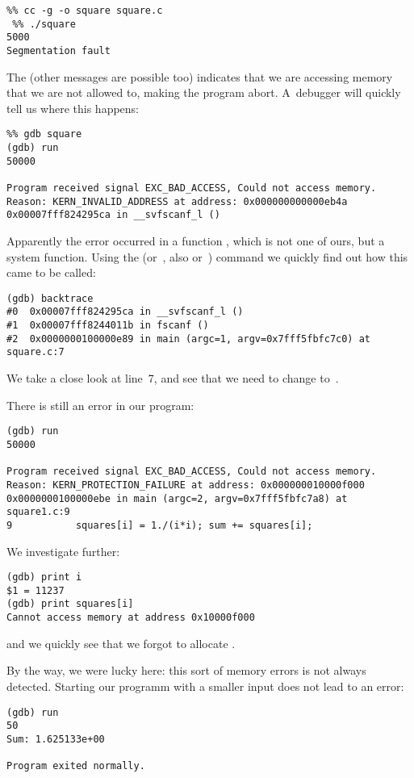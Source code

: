 \begin{verbatim}
%% cc -g -o square square.c
 %% ./square
5000
Segmentation fault
\end{verbatim}
The  (other messages are possible too) 
indicates that we are accessing
memory that we are not allowed to, making the program
abort. A~debugger will quickly tell us where this happens:
\begin{verbatim}
%% gdb square
(gdb) run
50000

Program received signal EXC_BAD_ACCESS, Could not access memory.
Reason: KERN_INVALID_ADDRESS at address: 0x000000000000eb4a
0x00007fff824295ca in __svfscanf_l ()
\end{verbatim}
Apparently the error occurred in a function , which is
not one of ours, but a system function. Using the 
(or~, also  or~) command we quickly find out how
this came to be called:
\begin{verbatim}
(gdb) backtrace
#0  0x00007fff824295ca in __svfscanf_l ()
#1  0x00007fff8244011b in fscanf ()
#2  0x0000000100000e89 in main (argc=1, argv=0x7fff5fbfc7c0) at square.c:7
\end{verbatim}
We take a close look at line~7, and see that we need to
change  to~.

There is still an error in our program:
\begin{verbatim}
(gdb) run
50000

Program received signal EXC_BAD_ACCESS, Could not access memory.
Reason: KERN_PROTECTION_FAILURE at address: 0x000000010000f000
0x0000000100000ebe in main (argc=2, argv=0x7fff5fbfc7a8) at square1.c:9
9           squares[i] = 1./(i*i); sum += squares[i];
\end{verbatim}
We investigate further:
\begin{verbatim}
(gdb) print i
$1 = 11237
(gdb) print squares[i]
Cannot access memory at address 0x10000f000
\end{verbatim}
and we quickly see that we forgot to allocate .

By the way, we were lucky here: this sort of memory errors is not always
detected. Starting our programm with a smaller input does not lead to
an error:
\begin{verbatim}
(gdb) run
50
Sum: 1.625133e+00

Program exited normally.
\end{verbatim}

